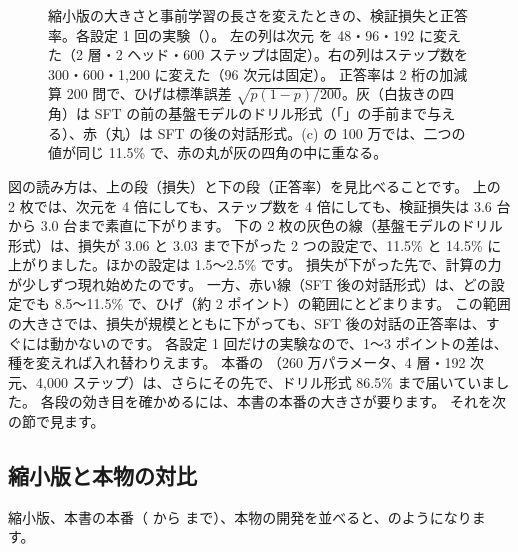 \begin{figure}[tbp]
\caption{縮小版の大きさと事前学習の長さを変えたときの、検証損失と正答率。各設定 1 回の実験（）。
左の列は次元  を 48・96・192 に変えた（2 層・2 ヘッド・600 ステップは固定）。右の列はステップ数を 300・600・1,200 に変えた（96 次元は固定）。
正答率は 2 桁の加減算 200 問で、ひげは標準誤差 $\sqrt{p(1-p)/200}$。灰（白抜きの四角）は SFT の前の基盤モデルのドリル形式（「\code{=}」の手前まで与える）、赤（丸）は SFT の後の対話形式。(c) の 100 万では、二つの値が同じ 11.5\% で、赤の丸が灰の四角の中に重なる。}
\label{fig:cap-sweep}
\end{figure}

図の読み方は、上の段（損失）と下の段（正答率）を見比べることです。
上の 2 枚では、次元を 4 倍にしても、ステップ数を 4 倍にしても、検証損失は 3.6 台から 3.0 台まで素直に下がります。
下の 2 枚の灰色の線（基盤モデルのドリル形式）は、損失が 3.06 と 3.03 まで下がった 2 つの設定で、11.5\% と 14.5\% に上がりました。ほかの設定は 1.5〜2.5\% です。
損失が下がった先で、計算の力が少しずつ現れ始めたのです。
一方、赤い線（SFT 後の対話形式）は、どの設定でも 8.5〜11.5\% で、ひげ（約 2 ポイント）の範囲にとどまります。
この範囲の大きさでは、損失が規模とともに下がっても、SFT 後の対話の正答率は、すぐには動かないのです。
各設定 1 回だけの実験なので、1〜3 ポイントの差は、種を変えれば入れ替わりえます。
本番の （260 万パラメータ、4 層・192 次元、4,000 ステップ）は、さらにその先で、ドリル形式 86.5\% まで届いていました。
各段の効き目を確かめるには、本書の本番の大きさが要ります。
それを次の節で見ます。

\subsection*{縮小版と本物の対比}

縮小版、本書の本番（ から  まで）、本物の開発を並べると、のようになります。

